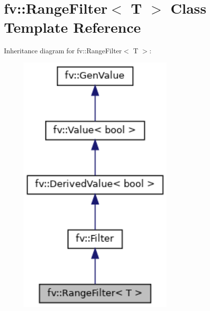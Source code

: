 \hypertarget{classfv_1_1RangeFilter}{}\section{fv\+:\+:Range\+Filter$<$ T $>$ Class Template Reference}
\label{classfv_1_1RangeFilter}


Inheritance diagram for fv\+:\+:Range\+Filter$<$ T $>$\+:
\nopagebreak
\begin{figure}[H]
\begin{center}
\leavevmode
\includegraphics[width=220pt]{classfv_1_1RangeFilter__inherit__graph}
\end{center}
\end{figure}


